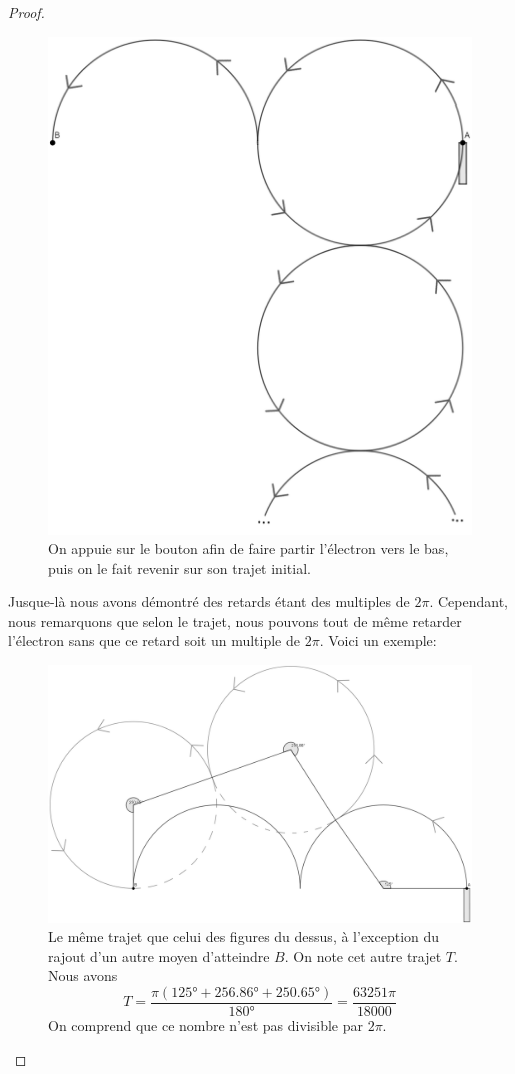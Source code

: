 \documentclass{amsart}
\theoremstyle{definition}
\theoremstyle{remark}
\numberwithin{equation}{section}
\begin{document}
\begin{proof}
  \begin{figure}[H]
    \centering
    \includegraphics[scale=0.2]{images/make_it_longer.png}
    \caption{On appuie sur le bouton afin de faire partir l'électron vers le bas, puis on le fait revenir sur son trajet initial.}
  \end{figure}

  Jusque-là nous avons démontré des retards étant des multiples de $2\pi$. Cependant, nous remarquons que selon le trajet, nous pouvons tout de même retarder l'électron sans que ce retard soit un multiple de $2\pi$. Voici un exemple:

  \begin{figure}[H]
    \centering
    \includegraphics[scale=0.205]{images/not_a_multiple_of_pi.png}
    \caption{Le même trajet que celui des figures du dessus, à l'exception du rajout d'un autre moyen d'atteindre $B$. On note cet autre trajet $T$. Nous avons \[T=\frac{\pi(125°+256.86°+250.65°)}{180°}=\frac{63251\pi}{18000}\] 
    On comprend que ce nombre n'est pas divisible par $2\pi$.}
  \end{figure}


\end{proof}
\end{document}
